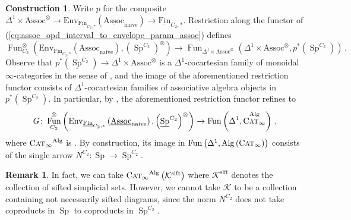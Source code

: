 \documentclass{article}
\DeclareMathOperator{\Alg}{Alg}
\DeclareMathOperator{\Cat}{Cat} %
\DeclareMathOperator{\CAT}{C\normalfont\textsc{at}_\infty} %
\DeclareMathOperator{\Fun}{Fun} %
\DeclareMathOperator{\Mod}{Mod} %
\DeclareMathOperator{\Spectra}{Sp} %
\newcommand{\Assoc}{\mathrm{Assoc}}
\newcommand{\Fin}{\mathrm{Fin}} %
\theoremstyle{definition}
\newtheorem{definition}[equation]{Definition}
\newtheorem{construction}[equation]{Construction}
\newtheorem{remark}[equation]{Remark}
\newcommand{\Lucy}[1]{\todo[color=cyan!30]{\footnotesize L: #1}}
\begin{document}
\begin{construction}
    Write $ p $ for the composite $ \Delta^1 \times \Assoc^\otimes \to \mathrm{Env}_{\underline{\Fin}_{C_2,*}}(\underline{\mathrm{Assoc}}_{\mathrm{naive}}) \to \underline{\Fin}_{C_2,*} $. 
    Restriction along the functor of (\ref{eq:assoc_opd_interval_to_envelope_param_assoc}) defines 
    \begin{equation}\label{eq:assoc_alg_norm_in_families}
        \Fun^\otimes_{C_2}\left(\mathrm{Env}_{\underline{\Fin}_{C_2,*}}\left(\underline{\mathrm{Assoc}}_{\mathrm{naive}}\right), \left(\underline{\Spectra}^{C_2}\right)^\otimes\right) \to \Fun_{\Delta^1 \times \Assoc^\otimes}\left(\Delta^1 \times \Assoc^\otimes, p^*\left(\underline{\Spectra}^{C_2}\right)\right) \,.
    \end{equation}
    Observe that $ p^*\left(\underline{\Spectra}^{C_2}\right) \to \Delta^1 \times \Assoc^\otimes $ is a $ \Delta^1 $-cocartesian family of monoidal $ \infty $-categories in the sense of \cite[Definition 4.8.3.1]{LurHA}, and the image of the aforementioned restriction functor consists of $ \Delta^1 $-cocartesian families of associative algebra objects in $ p^*\left(\underline{\Spectra}^{C_2}\right) $. 
    In particular, by \cite[Remark 4.8.3.8]{LurHA}, the aforementioned restriction functor refines to 
    \begin{equation}\label{eq:assoc_alg_norm_in_families_straightened}
        G \colon \Fun^\otimes_{C_2}\left(\mathrm{Env}_{\underline{\Fin}_{C_2,*}}\left(\underline{\mathrm{Assoc}}_{\mathrm{naive}}\right), \left(\underline{\Spectra}^{C_2}\right)^\otimes\right) \to \Fun\left(\Delta^1, \CAT^{\Alg} \right) \,, 
     \end{equation} 
     where $ \CAT^{\Alg} $ is \cite[Definition 4.8.3.7]{LurHA}. 
     By construction, its image in $ \Fun\left(\Delta^1,\Alg\left(\CAT\right) \right) $ consists of the single arrow $ N^{C_2} \colon \Spectra \to \Spectra^{C_2} $. 
\end{construction}
\begin{remark}
    In fact, we can take $ \CAT^{\Alg}\left(\mathcal{K}^{\mathrm{sift}}\right) $ where $ \mathcal{K}^{\mathrm{sift}} $ denotes the collection of sifted simplicial sets. 
    However, we cannot take $ \mathcal{K} $ to be a collection containing not necessarily sifted diagrams, since the norm $ N^{C_2} $ does not take coproducts in $ \Spectra $ to coproducts in $ \Spectra^{C_2} $.  
\end{remark}
\end{document}
